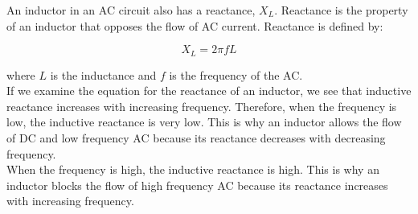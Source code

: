 An inductor in an AC circuit also has a reactance, $X_L$. Reactance is the property of an inductor that opposes the flow of AC current. Reactance is defined by:

\begin{equation*}
X_L = 2\pi fL
\end{equation*}
 
where $L$ is the inductance and $f$ is the frequency of the AC.\\
 
If we examine the equation for the reactance of an inductor, we see that inductive reactance increases with increasing frequency. Therefore, when the frequency is low, the inductive reactance is very low. This is why an inductor allows the flow of DC and low frequency AC because its reactance decreases with decreasing frequency.\\ 
 
When the frequency is high, the inductive reactance is high. This is why an inductor blocks the flow of high frequency AC because its reactance increases with increasing frequency.


